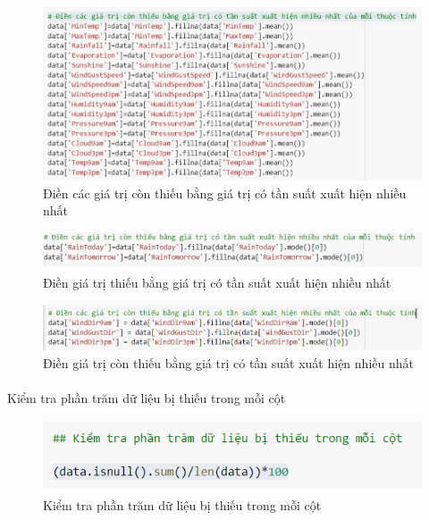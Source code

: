 \documentclass{article}
\begin{document}
\begin{figure}[!h]
	\begin{center}
		\includegraphics[width=\linewidth]{images/code15.png}
		\caption{\fontsize{14}{20}\selectfont Điền các giá trị còn thiếu bằng giá trị có tần suất xuất hiện nhiều nhất}
	\end{center}
\end{figure}
\pagebreak
\begin{figure}[!h]
	\begin{center}
		\includegraphics[width=\linewidth]{images/code16.png}
		\caption{\fontsize{14}{20}\selectfont Điền giá trị thiếu bằng giá trị có tần suất xuất hiện nhiều nhất}
	\end{center}
\end{figure}

\begin{figure}[!h]
	\begin{center}
		\includegraphics[width=\linewidth]{images/code17.png}
		\caption{\fontsize{14}{20}\selectfont Điền giá trị còn thiếu bằng giá trị có tần suất xuất hiện nhiều nhất}
	\end{center}
\end{figure}
\paragraph{}Kiểm tra phần trăm dữ liệu bị thiếu trong mỗi cột
\begin{figure}[!h]
	\begin{center}
		\includegraphics[width=\linewidth]{images/code18.png}
		\caption{\fontsize{14}{20}\selectfont Kiểm tra phần trăm dữ liệu bị thiếu trong mỗi cột}
	\end{center}
\end{figure}
\end{document}
